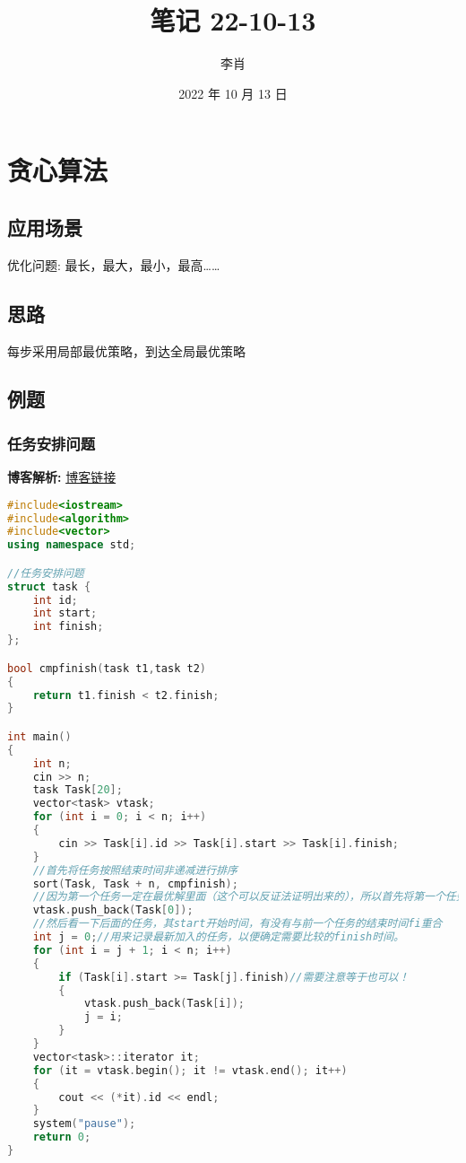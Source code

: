 \documentclass[UTF8]{ctexart}
\title{笔记 22-10-13}
\author{李肖}
\date{2022 年 10 月 13 日}
\begin{document}
\maketitle

\section{贪心算法}

\subsection{应用场景}
优化问题: 最长，最大，最小，最高……

\subsection{思路}
每步采用局部最优策略，到达全局最优策略

\subsection{例题}
\subsubsection{任务安排问题}

\textbf{博客解析: } \href{https://blog.csdn.net/DayOneMore/article/details/68938850}{博客链接}

\begin{lstlisting}[language=C++]
#include<iostream>
#include<algorithm>
#include<vector>
using namespace std;

//任务安排问题
struct task {
    int id;
    int start;
    int finish;
};

bool cmpfinish(task t1,task t2)
{
    return t1.finish < t2.finish;
}

int main()
{
    int n;
    cin >> n;
    task Task[20];
    vector<task> vtask;
    for (int i = 0; i < n; i++)
    {
        cin >> Task[i].id >> Task[i].start >> Task[i].finish;
    }
    //首先将任务按照结束时间非递减进行排序
    sort(Task, Task + n, cmpfinish);
    //因为第一个任务一定在最优解里面（这个可以反证法证明出来的），所以首先将第一个任务加入
    vtask.push_back(Task[0]);
    //然后看一下后面的任务，其start开始时间，有没有与前一个任务的结束时间fi重合
    int j = 0;//用来记录最新加入的任务，以便确定需要比较的finish时间。
    for (int i = j + 1; i < n; i++)
    {
        if (Task[i].start >= Task[j].finish)//需要注意等于也可以！
        {
            vtask.push_back(Task[i]);
            j = i;
        }
    }
    vector<task>::iterator it;
    for (it = vtask.begin(); it != vtask.end(); it++)
    {
        cout << (*it).id << endl;
    }
    system("pause");
    return 0;
}

\end{lstlisting}
\end{document}
